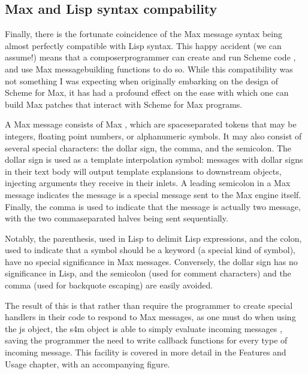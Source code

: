 \documentclass[letterpaper,10pt,english]{sphinxmanual}
\begin{document}
\subsection{Max and Lisp syntax compability}
\label{\detokenize{design:max-and-lisp-syntax-compability}}
\sphinxAtStartPar
Finally, there is the fortunate coincidence of the Max message syntax being almost perfectly compatible with Lisp syntax.
This happy accident (we can assume!) means that a composer\sphinxhyphen{}programmer can create and run Scheme code , and
use Max message\sphinxhyphen{}building functions to do so.
While this compatibility was not something I was expecting when originally embarking on the design of Scheme for Max,
it has had a profound effect on the ease with which one can build Max patches that interact with Scheme for Max programs.

\sphinxAtStartPar
A Max message consists of Max , which are space\sphinxhyphen{}separated tokens that may be integers, floating point numbers, or alpha\sphinxhyphen{}numeric symbols.
It may also consist of several special characters: the dollar sign, the comma, and the semi\sphinxhyphen{}colon.
The dollar sign is used as a template interpolation symbol: messages with dollar signs in their text body will output template
explansions to downstream objects, injecting arguments they receive in their inlets.
A leading semi\sphinxhyphen{}colon in a Max message indicates the message is a special message sent to the Max engine itself.
Finally, the comma is used to indicate that the message is actually two message, with the two comma\sphinxhyphen{}separated halves being sent sequentially.

\sphinxAtStartPar
Notably, the parenthesis, used in Lisp to delimit Lisp expressions, and the colon, used to indicate that a symbol should be a keyword (a special kind of symbol),
have no special significance in Max messages.
Conversely, the dollar sign has no significance in Lisp, and the semi\sphinxhyphen{}colon (used for comment characters) and the comma
(used for back\sphinxhyphen{}quote escaping) are easily avoided.

\sphinxAtStartPar
The result of this is that rather than require the programmer to create special handlers in their code to respond to Max messages,
as one must do when using the js object, the s4m object is able to simply evaluate incoming messages ,
saving the programmer the need to write callback functions for every type of incoming message.
This facility is covered in more detail in the Features and Usage chapter, with an accompanying figure.
\end{document}
